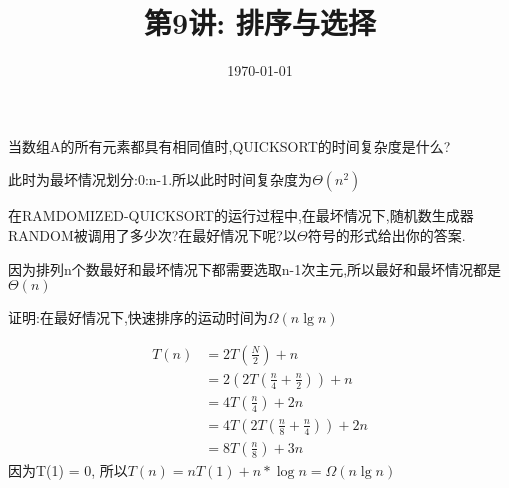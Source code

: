 \documentclass[a4paper, justified]{tufte-handout}
\title{第9讲: 排序与选择}
\date{\today} %
\begin{document}
\maketitle
\noplagiarism %
\begin{abstract}
\end{abstract}
\beginrequired

\begin{problem}[TC 7.2-2]
当数组A的所有元素都具有相同值时,QUICKSORT的时间复杂度是什么?
\end{problem}

\begin{solution}
  此时为最坏情况划分:0:n-1.所以此时时间复杂度为$\Theta(n^2)$
\end{solution}

\begin{problem}[TC 7.3-2]
在RAMDOMIZED-QUICKSORT的运行过程中,在最坏情况下,随机数生成器RANDOM被调用了多少次?在最好情况下呢?以$\Theta $符号的形式给出你的答案.
\end{problem}

\begin{solution}
  因为排列n个数最好和最坏情况下都需要选取n-1次主元,所以最好和最坏情况都是$\Theta(n)$
\end{solution}

\begin{problem}[TC 7.4-2]
证明:在最好情况下,快速排序的运动时间为$\Omega(n\lg n)$
\end{problem}

\begin{solution}
  $$
    \begin{aligned}
      T(n) & = 2T(\frac{N}{2}) + n                   \\
           & =2(2T(\frac{n}{4} + \frac{n}{2})) + n   \\
           & =4T(\frac{n}{4}) + 2n                   \\
           & =4T(2T(\frac{n}{8} + \frac{n}{4})) + 2n \\
           & =8T(\frac{n}{8}) + 3n
    \end{aligned}
  $$
  因为T(1) = 0, 所以$T(n) = nT(1)+n*\log n = \Omega(n\lg n)$
\end{solution}
\end{document}

